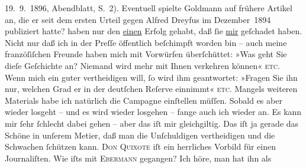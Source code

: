 \begin{ledgroupsized}[t]{13cm}
{{{                        19. 9. 1896, Abendblatt, S. 2). Eventuell spielte Goldmann auf frühere Artikel an, die er seit
                  dem ersten Urteil gegen Alfred Dreyfus im
                     Dezember 1894 publiziert hatte?}}}\label{K_L02786-14h} haben nur
               den \uline{einen} Erfolg gehabt, daß ſie \uline{mir} geſchadet haben. Nicht nur daß ich in der Preſſe öffentlich
               beſchimpft worden bin – auch meine franzöſiſchen Freunde haben mich mit Vorwürfen überſchüttet: »Was geht Sie
               dieſe Geſchichte an? Niemand wird mehr mit Ihnen verkehren können« \textsc{etc.} Wenn mich ein guter {\pb}\label{K_L02786-15v}\label{K_L02786-15h} vertheidigen will, ſo wird ihm geantwortet: »Fragen Sie ihn
               nur, welchen Grad er in der deutſchen Reſerve einnimmt« \textsc{etc}. Mangels weiteren
               Materials habe ich natürlich die Campagne einſtellen müſſen. Sobald es aber wieder
               losgeht – und es wird wieder losgehen – fange auch ich wieder an. Es kann mir ſehr
               ſchlecht dabei gehen – aber das iſt  mir
               gleichgiltig. Das iſt ja gerade das Schöne in unſerem Metier, daß {\pb}man die Unſchuldigen vertheidigen und die Schwachen
               ſchützen kann. \textsc{Don Quixote} iſt ein herrliches Vorbild für einen 
               Journaliſten.\pend
           \pstart
           Wie iſts mit \textsc{Ebermann} gegangen? Ich höre, man hat ihn als \label{K_L02786-17v}
\end{ledgroupsized}

